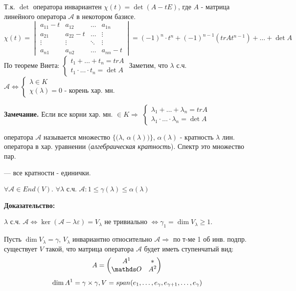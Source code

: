 Т.к. $\det$ оператора инвариантен $\chi(t) = \det (A - tE)$, где $A$ - матрица линейного оператора $\mathcal{A}$ в некотором базисе.
$$\chi(t) =\begin{vmatrix}
    a_{11} -t & a_{12} & \ldots & a_{1n} \\
    a_{21} & a_{22}-t & \ldots & \vdots\\
    \vdots & \vdots & \ddots & \vdots\\
    a_{n1} & a_{n2} & \ldots & a_{nn}-t
\end{vmatrix} = (-1)^{n}\cdot t^n + (-1)^{n-1}(tr At^{n-1}) + \ldots + \det A$$
По теореме Виета:
$\begin{cases}
t_1 +\ldots+t_n = tr A\\
t_1\cdot \ldots \cdot t_n = \det A
\end{cases}$
Заметим, что $\lambda$ с.ч. $\mathcal{A} \Leftrightarrow\begin{cases}
    \lambda \in K\\
    \chi(\lambda) = 0 \text{ - корень хар. мн.}
\end{cases}$

\textbf{Замечание.} Если все корни хар. мн. $\in K \Rightarrow$ $\begin{cases}
\lambda_1 +\ldots+\lambda_n = tr A\\
\lambda_1\cdot \ldots \cdot \lambda_n = \det A
\end{cases}$

  оператора $\mathcal{A}$ называется множество $\{ (\lambda$, $\alpha(\lambda)) \}$, 
$\alpha(\lambda)$ - кратность $\lambda$ лин. оператора в хар. уравнении (\emph{алгебраическая кратность}). Спектр это множество пар.

  --- все кратности -  единички.



$\forall \mathcal{A}\in End(V)$. $\forall \lambda$ с.ч. $\mathcal{A} : 1\leq \gamma(\lambda)\leq \alpha(\lambda)$

\textbf{Доказательство:}

$\lambda$ с.ч. $\mathcal{A} \Leftrightarrow \ker(\mathcal{A}-\lambda \varepsilon)= V_{\lambda}$ не тривиально $\Leftrightarrow \gamma_1=\dim V_\lambda\geq 1$.

Пусть $\dim V_{\lambda} = \gamma$, $V_{\lambda}$ инвариантно относительно $\mathcal{A} \Rightarrow$ по т-ме 1 об инв. подпр. существует $V$ такой, что матрица оператора $\mathcal{A}$ будет иметь ступенчатый вид:
$$A =\begin{pmatrix}
    A^1 & *\\
    \zero & A^2
\end{pmatrix}$$
$$\dim A^1 = \gamma \times \gamma,V = span(e_1,\ldots, e_{\gamma},e_{\gamma+1},\ldots,e_{\gamma})$$

